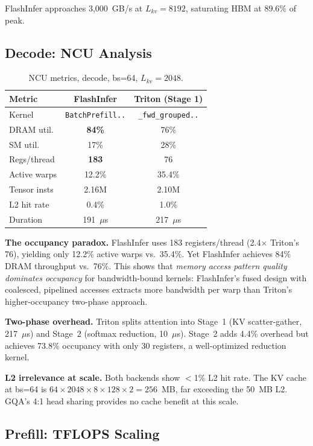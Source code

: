 \documentclass[10pt,twocolumn]{article}
\begin{document}
FlashInfer approaches 3,000~GB/s at $L_{kv}=8192$, saturating HBM at 89.6\% of peak.

\subsection{Decode: NCU Analysis}

\begin{table}[h]
\centering
\small
\caption{NCU metrics, decode, bs=64, $L_{kv}=2048$.}
\label{tab:ncu_decode}
\begin{tabular}{@{}lcc@{}}
\toprule
Metric & FlashInfer & Triton (Stage 1) \\
\midrule
Kernel       & \texttt{BatchPrefill..} & \texttt{\_fwd\_grouped..} \\
DRAM util.   & \textbf{84\%} & 76\% \\
SM util.     & 17\% & 28\% \\
Regs/thread  & \textbf{183} & 76 \\
Active warps & 12.2\% & 35.4\% \\
Tensor insts & 2.16M & 2.10M \\
L2 hit rate  & 0.4\% & 1.0\% \\
Duration     & 191~$\mu$s & 217~$\mu$s \\
\bottomrule
\end{tabular}
\end{table}

\textbf{The occupancy paradox.}  FlashInfer uses 183 registers/thread (2.4$\times$ Triton's 76), yielding only 12.2\% active warps vs.\ 35.4\%.  Yet FlashInfer achieves 84\% DRAM throughput vs.\ 76\%.  This shows that \emph{memory access pattern quality dominates occupancy} for bandwidth-bound kernels: FlashInfer's fused design with coalesced, pipelined accesses extracts more bandwidth per warp than Triton's higher-occupancy two-phase approach.

\textbf{Two-phase overhead.}  Triton splits attention into Stage~1 (KV scatter-gather, 217~$\mu$s) and Stage~2 (softmax reduction, 10~$\mu$s).  Stage~2 adds 4.4\% overhead but achieves 73.8\% occupancy with only 30 registers, a well-optimized reduction kernel.

\textbf{L2 irrelevance at scale.}  Both backends show $<$1\% L2 hit rate.  The KV cache at bs=64 is $64 \times 2048 \times 8 \times 128 \times 2 = 256$~MB, far exceeding the 50~MB L2.  GQA's 4:1 head sharing provides no cache benefit at this scale.

\subsection{Prefill: TFLOPS Scaling}
\label{sec:prefill}
\end{document}
